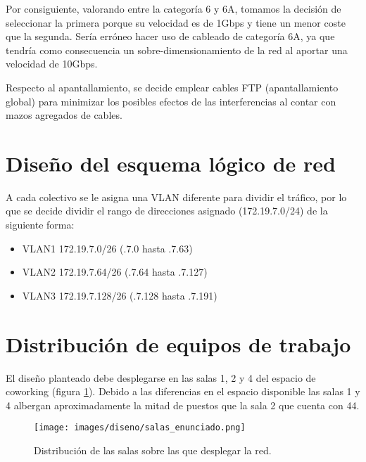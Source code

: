 \vspace{1mm}

Por consiguiente, valorando entre la categoría 6 y 6A, tomamos la decisión de seleccionar la primera porque su velocidad es de 1Gbps y tiene un menor coste que la segunda. Sería erróneo hacer uso de cableado de categoría 6A, ya que tendría como consecuencia un sobre-dimensionamiento de la red al aportar una velocidad de 10Gbps. 

\vspace{1mm}

Respecto al apantallamiento, se decide emplear cables FTP (apantallamiento global) para minimizar los posibles efectos de las interferencias al contar con mazos agregados de cables.
    
\section{Diseño del esquema lógico de red}

A cada colectivo se le asigna una VLAN diferente para dividir el tráfico, por lo que se decide dividir el rango de direcciones asignado (172.19.7.0/24) de la siguiente forma:
\begin{itemize}
    \item VLAN1 172.19.7.0/26 (.7.0 hasta .7.63)
    \item VLAN2 172.19.7.64/26 (.7.64 hasta .7.127)
    \item VLAN3 172.19.7.128/26 (.7.128 hasta .7.191)
\end{itemize}


\section{Distribución de equipos de trabajo}

El diseño planteado debe desplegarse en las salas 1, 2 y 4 del espacio de coworking (figura \ref{fig:salas}). Debido a las diferencias en el espacio disponible las salas 1 y 4 albergan aproximadamente la mitad de puestos que la sala 2 que cuenta con 44.

\vspace{2mm}

    \begin{figure}[h]
    	\centering
    	\texttt{[image: images/diseno/salas\_enunciado.png]}
    	\caption{Distribución de las salas sobre las que desplegar la red.}
    	\label{fig:salas}
    \end{figure}
    
